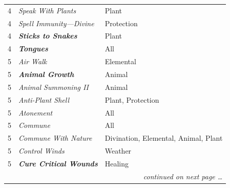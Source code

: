 \begin{multicols}{2}
\begin{tabular}{|p{}|p{}|p{}|}
4	& \textit{Speak With Plants}	& Plant \\
\rowcolor[gray]{.9}4	& \textit{Spell Immunity---Divine}	& Protection \\
4	& \textbf{\textit{Sticks to Snakes}}	& Plant \\
\rowcolor[gray]{.9}4	& \textbf{\textit{Tongues}}	& All \\
5	& \textit{Air Walk}	& Elemental \\
\rowcolor[gray]{.9}5	& \textbf{\textit{Animal Growth}}	& Animal \\
5	& \textit{Animal Summoning II}	& Animal \\
\rowcolor[gray]{.9}5	& \textit{Anti-Plant Shell}	& Plant, Protection \\
5	& \textit{Atonement}	& All \\
\rowcolor[gray]{.9}5	& \textit{Commune}	& All \\
5	& \textit{Commune With Nature}	& Divination, Elemental, Animal, Plant \\
\rowcolor[gray]{.9}5	& \textit{Control Winds}	& Weather \\
5	& \textbf{\textit{Cure Critical Wounds}}	& Healing \\
\hline
\multicolumn{3}{r}{\textit{continued on next page \ldots}} \\
\end{tabular}


\end{multicols}
